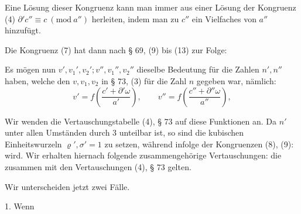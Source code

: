 Eine Lösung dieser Kongruenz kann man immer aus einer Lösung der
Kongruenz (4) $\partial' c'' \equiv c \ (\mathrm{mod}\ a'')$ herleiten, indem
man zu $c''$ ein Vielfaches von $a''$ hinzufügt.

Die Kongruenz (7) hat dann nach § 69, (9) bis (13) zur Folge:

Es mögen nun $v', v_1', v_2'; v'', v_1'', v_2''$ dieselbe Bedeutung für die
Zahlen $n', n''$ haben, welche den $v, v_1, v_2$ in § 73, (3) für die Zahl
$n$ gegeben war, nämlich:
\[
v' = f\left(\frac{c' + \partial'\omega}{a'}\right), \qquad
v'' = f\left(\frac{c'' + \partial''\omega}{a''}\right),
\]

Wir wenden die Vertauschungstabelle (4), § 73 auf diese Funktionen an.
Da $n'$ unter allen Umständen durch 3 unteilbar ist, so sind die
kubischen Einheitswurzeln $\varrho', \sigma' = 1$ zu setzen, während
infolge der Kongruenzen (8), (9):
wird. Wir erhalten hiernach folgende zusammengehörige Vertauschungen:
die zusammen mit den Vertauschungen (4), § 73 gelten.

Wir unterscheiden jetzt zwei Fälle.

1. Wenn
